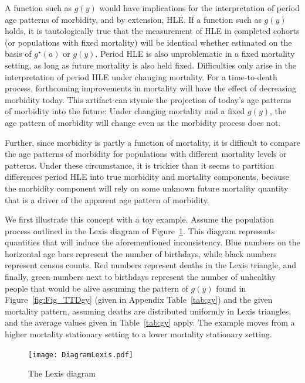 \documentclass[11pt,oneside,a4paper]{article} %
\begin{document}
A function such as $g(y)$ would have implications for the interpretation of
period age patterns of morbidity, and by extension, HLE. If a function such as $g(y)$ holds, it is tautologically true that the
measurement of HLE in completed cohorts (or populations with fixed mortality)
will be identical whether estimated on the basis of $g^\star(a)$ or $g(y)$.
Period HLE is also unproblematic in a fixed mortality setting, as long as future
mortality is also held fixed. Difficulties only arise in the interpretation of
period HLE under changing mortality. For a time-to-death process, forthcoming
improvements in mortality will have the effect of decreasing morbidity today.
This artifact can stymie the projection of today's age patterns of morbidity
into the future: Under changing mortality and a fixed $g(y)$, the age pattern of
morbidity will change even as the morbidity process does not. 

Further, since morbidity is partly a function of mortality, it is difficult to
compare the age patterns of morbidity for populations with different mortality
levels or patterns. Under these circumstance, it is trickier than it seems to
partition differences period HLE into true morbidity and mortality components, because the morbidity component will rely on some unknown future mortality quantity that is a driver of the apparent age pattern of morbidity.
 
We first illustrate this concept with a toy example. Assume the population
process outlined in the Lexis diagram of Figure~\ref{fig:Fig_DiagramLexis}. This
diagram represents quantities that will induce the aforementioned inconsistency.
Blue numbers on the horizontal age bars represent the number of birthdays, while
black numbers represent census counts. Red numbers represent deaths in the
Lexis triangle, and finally, green numbers next to birthdays represent the
number of unhealthy people that would be alive assuming the pattern of $g(y)$
found in Figure~\ref{fig:Fig_TTDgy} (given in Appendix Table~\ref{tab:gy}) and
the given mortality pattern, assuming deaths are distributed uniformly in Lexis
triangles, and the average values given in Table~\ref{tab:gy} apply. The example
moves from a higher mortality stationary setting to a lower mortality stationary
setting.

\begin{figure}
\begin{adjustwidth}{-1.5cm}{}
	\centering
	\texttt{[image: DiagramLexis.pdf]}
	\caption{The Lexis diagram}
	\label{fig:Fig_DiagramLexis}
\end{adjustwidth}
\end{figure}
\end{document}
